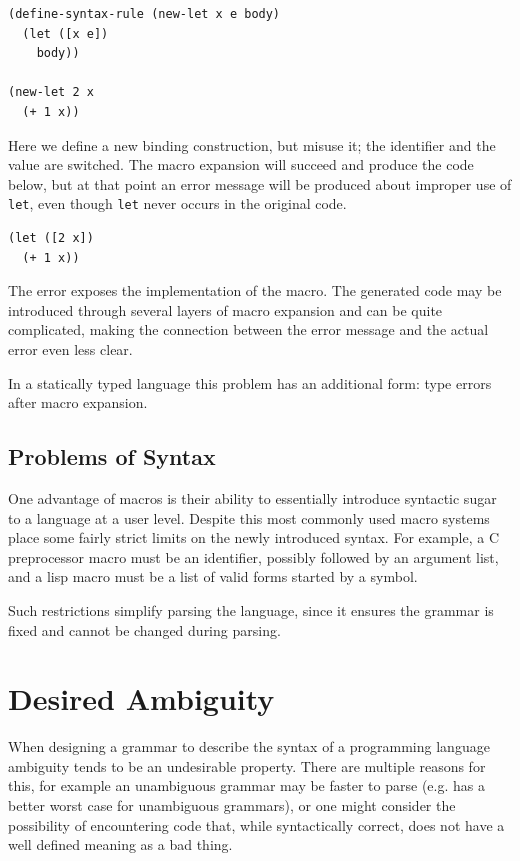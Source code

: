 \documentclass{kththesis}
\begin{document}
\begin{verbatim}
(define-syntax-rule (new-let x e body)
  (let ([x e])
    body))

(new-let 2 x
  (+ 1 x))
\end{verbatim}

Here we define a new binding construction, but misuse it; the identifier and the value are switched. The macro expansion will succeed and produce the code below, but at that point an error message will be produced about improper use of \texttt{let}, even though \texttt{let} never occurs in the original code.

\begin{verbatim}
(let ([2 x])
  (+ 1 x))
\end{verbatim}

The error exposes the implementation of the macro. The generated code may be introduced through several layers of macro expansion and can be quite complicated, making the connection between the error message and the actual error even less clear.

In a statically typed language this problem has an additional form: type errors after macro expansion.

\subsection{Problems of Syntax} \label{sec:problem-syntax}

One advantage of macros is their ability to essentially introduce syntactic sugar to a language at a user level. Despite this most commonly used macro systems place some fairly strict limits on the newly introduced syntax. For example, a C preprocessor macro must be an identifier, possibly followed by an argument list, and a lisp macro must be a list of valid forms started by a symbol.

Such restrictions simplify parsing the language, since it ensures the grammar is fixed and cannot be changed during parsing.

\section{Desired Ambiguity} \label{sec:desired-ambiguity}


When designing a grammar to describe the syntax of a programming language ambiguity tends to be an undesirable property. There are multiple reasons for this, for example an unambiguous grammar may be faster to parse (e.g. \cite{Earley1970An-Efficient-Co} has a better worst case for unambiguous grammars), or one might consider the possibility of encountering code that, while syntactically correct, does not have a well defined meaning as a bad thing.
\end{document}
